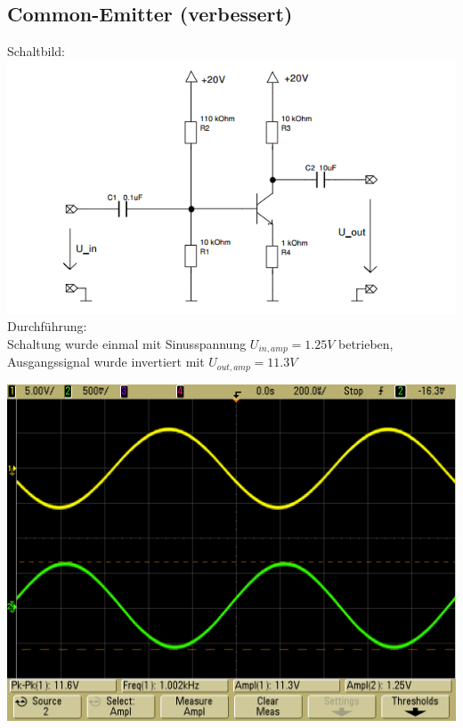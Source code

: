 \documentclass[compress,11pt]{beamer}
\begin{document}
\subsection{Common-Emitter (verbessert)}
\begin{frame}
Schaltbild:\\
\includegraphics[width=.7\textwidth]{schaltbilder/schalt_3b}\\
Durchführung:\\

Schaltung wurde einmal mit Sinusspannung $U_{in,amp} = 1.25 V$ betrieben, Ausgangssignal wurde invertiert mit $U_{out,amp} = 11.3 V$

\end{frame}
\begin{frame}
\includegraphics[width=.7\textwidth]{../daten/oszi/scope_51}
\end{frame}
\end{document}
